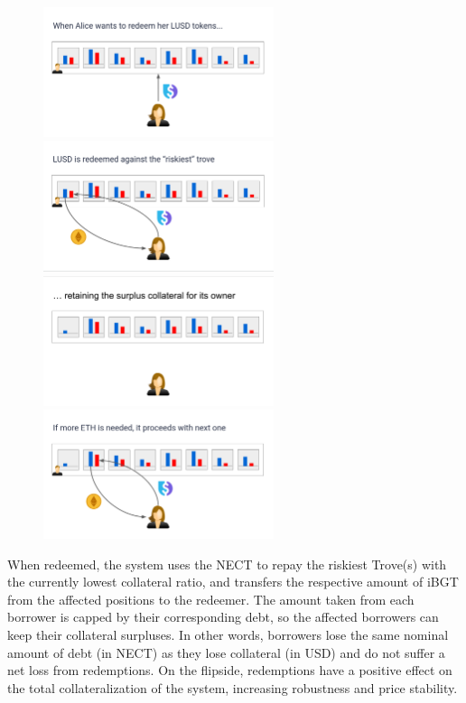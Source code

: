 \documentclass{article}
\begin{document}
\begin{figure}[h]
\centering
\includegraphics[width=6.75cm]{a1.png}
\includegraphics[width=6.75cm]{a2.png}
\includegraphics[width=6.75cm]{a3.png}
\includegraphics[width=6.75cm]{a4.png}
\end{figure}

When redeemed, the system uses the NECT to repay the riskiest Trove(s) with the currently lowest collateral ratio, and transfers the respective amount of iBGT from the affected positions to the redeemer. The amount taken from each borrower is capped by their corresponding debt, so the affected borrowers can keep their collateral surpluses. In other words, borrowers lose the same nominal amount of debt (in NECT) as they lose collateral (in USD) and do not suffer a net loss from redemptions. On the flipside, redemptions have a positive effect on the total collateralization of the system, increasing robustness and price stability.
\end{document}
